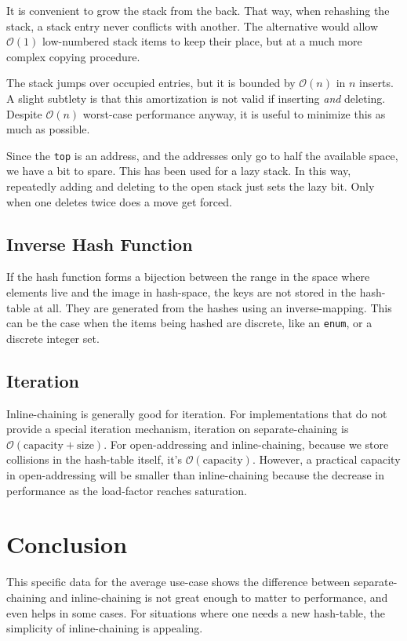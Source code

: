 \documentclass[12pt]{article}
\newcommand{\code}[1]{\colorbox{light-gray}{\texttt{#1}}}
\begin{document}
It is convenient to grow the stack from the back. That way, when rehashing the stack, a stack entry never conflicts with another. The alternative would allow $\mathcal{O}(1)$ low-numbered stack items to keep their place, but at a much more complex copying procedure.

The stack jumps over occupied entries, but it is bounded by $\mathcal{O}(n)$ in $n$ inserts. A slight subtlety is that this amortization is not valid if inserting {\it and} deleting. Despite $\mathcal{O}(n)$ worst-case performance anyway, it is useful to minimize this as much as possible.

Since the \code{top} is an address, and the addresses only go to half the available space, we have a bit to spare. This has been used for a lazy stack. In this way, repeatedly adding and deleting to the open stack just sets the lazy bit. Only when one deletes twice does a move get forced.

\subsection{Inverse Hash Function}

If the hash function forms a bijection between the range in the space where elements live and the image in hash-space, the keys are not stored in the hash-table at all. They are generated from the hashes using an inverse-mapping. This can be the case when the items being hashed are discrete, like an \code{enum}, or a discrete integer set.

\subsection{Iteration}

Inline-chaining is generally good for iteration. For implementations that do not provide a special iteration mechanism, iteration on separate-chaining is $\mathcal{O}(\text{capacity} + \text{size})$. For open-addressing and inline-chaining, because we store collisions in the hash-table itself, it's $\mathcal{O}(\text{capacity})$. However, a practical capacity in open-addressing will be smaller than inline-chaining because the decrease in performance as the load-factor reaches saturation.

\section{Conclusion}

This specific data for the average use-case shows the difference between separate-chaining and inline-chaining is not great enough to matter to performance, and even helps in some cases. For situations where one needs a new hash-table, the simplicity of inline-chaining is appealing.


\end{document}
